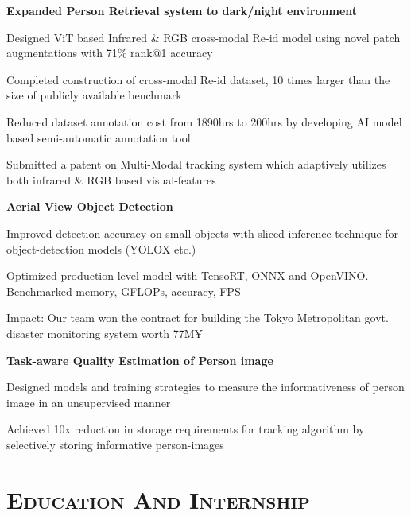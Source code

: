 \documentclass[a4paper,10pt]{article}
\newcommand{\SubItem}[1]{
    {\setlength\itemindent{13pt} \item[\raisebox{.25\height}{\tiny\square}] #1}
}
\newlength{\itemgap}
\newlength{\itembefore}
\begin{document}
\begin{itemize}[topsep=\itembefore,itemsep=\itemgap,partopsep=0pt, parsep=0pt]


\item \textbf {Expanded Person Retrieval system to dark/night environment}
\SubItem{Designed ViT based Infrared \& RGB cross-modal Re-id model using novel patch augmentations with 71\% rank@1 accuracy}
\SubItem{Completed construction of cross-modal Re-id dataset, 10 times larger than the size of publicly available benchmark}
\SubItem{Reduced dataset annotation cost from 1890hrs to 200hrs by developing AI model based semi-automatic annotation tool}
\SubItem{Submitted a patent on Multi-Modal tracking system which adaptively utilizes both infrared \& RGB based visual-features}

\item \textbf {Aerial View Object Detection}
\SubItem{Improved detection accuracy on small objects with sliced-inference technique for object-detection models (YOLOX etc.)}
\SubItem{Optimized production-level model with TensoRT, ONNX and OpenVINO. Benchmarked memory, GFLOPs, accuracy, FPS}
\SubItem{Impact: Our team won the contract for building the Tokyo Metropolitan govt. disaster monitoring system worth 77M¥}

\item \textbf {Task-aware Quality Estimation of Person image}
\SubItem{Designed models and training strategies to measure the informativeness of person image in an unsupervised manner}
\SubItem{Achieved 10x reduction in storage requirements for tracking algorithm by selectively storing informative person-images}
\end{itemize}






\section{\scshape{Education And Internship}}
\end{document}
